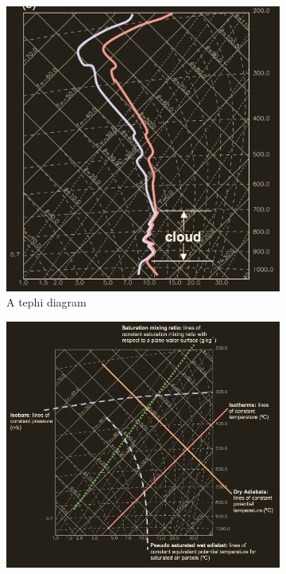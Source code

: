 \begin{figure}[H]
     \centering
     \begin{subfigure}[b]{0.4\textwidth}
         \centering
         \includegraphics[height=1.325\textwidth,width=\textwidth]{figures_c1/tephiuse.png}
         \caption{A tephi diagram}
         \label{fig:tephidiag}
     \end{subfigure}
     \hfill
     \begin{subfigure}[b]{0.59\textwidth}
         \centering
         \includegraphics[width=\textwidth]{figures_c1/tephidescribe.png}

\end{subfigure}
\end{figure}
